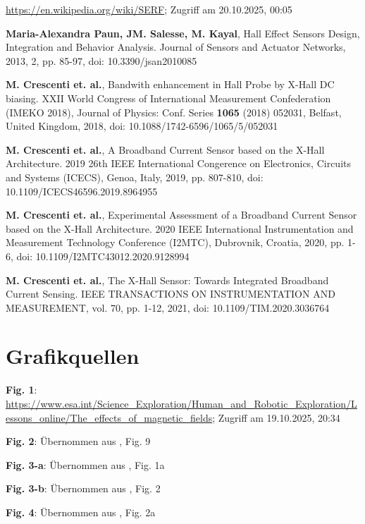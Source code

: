 \documentclass[12pt, a4paper]{article}
\begin{document}
\begin{thebibliography}{}
		\url{https://en.wikipedia.org/wiki/SERF}; Zugriff am 20.10.2025, 00:05 
		
		
		
		
		
		\textbf{Maria-Alexandra Paun, JM. Salesse, M. Kayal}, Hall Effect Sensors Design, Integration and Behavior Analysis. Journal of Sensors and Actuator Networks, 2013, 2, pp. 85-97, doi: 10.3390/jsan2010085
		
		\textbf{M. Crescenti et. al.}, Bandwith enhancement in Hall Probe by X-Hall DC biasing. XXII World Congress of International Measurement Confederation (IMEKO 2018), Journal of Physics: Conf. Series \textbf{1065} (2018) 052031, Belfast, United Kingdom, 2018, doi: 10.1088/1742-6596/1065/5/052031
		
		\textbf{M. Crescenti et. al.}, A  Broadband Current Sensor based on the X-Hall Architecture. 2019 26th IEEE International Congerence on Electronics, Circuits and Systems (ICECS), Genoa, Italy, 2019, pp. 807-810, doi: 10.1109/ICECS46596.2019.8964955
		
		\textbf{M. Crescenti et. al.}, Experimental Assessment of a Broadband Current Sensor based on the X-Hall Architecture. 2020 IEEE International Instrumentation and Measurement Technology Conference (I2MTC), Dubrovnik, Croatia, 2020, pp. 1-6, doi: 10.1109/I2MTC43012.2020.9128994
					
		\textbf{M. Crescenti et. al.}, The X-Hall Sensor: Towards Integrated Broadband Current Sensing. IEEE TRANSACTIONS ON INSTRUMENTATION AND MEASUREMENT, vol. 70, pp. 1-12, 2021, doi: 10.1109/TIM.2020.3036764
		

		
		
		
		
		
		
	\end{thebibliography}
		
	\section*{Grafikquellen}
		\begin{description}
			\item \textbf{Fig. 1}: \url{https://www.esa.int/Science_Exploration/Human_and_Robotic_Exploration/Lessons_online/The_effects_of_magnetic_fields}; Zugriff am 19.10.2025, 20:34
			\item \textbf{Fig. 2}: Übernommen aus \cite{tarduno25}, Fig. 9
			\item \textbf{Fig. 3-a}: Übernommen aus \cite{cres18}, Fig. 1a
			\item \textbf{Fig. 3-b}: Übernommen aus \cite{cres20}, Fig. 2
			\item \textbf{Fig. 4}: Übernommen aus \cite{cres18}, Fig. 2a
			
		\end{description}
		
		
\end{document}
